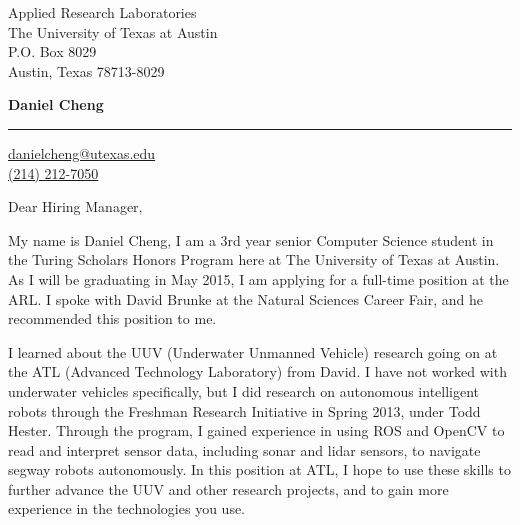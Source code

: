 \documentclass{letter} %
\begin{document}
\signature{Daniel Cheng}                   %
\longindentation=0pt                       %
\let\raggedleft\raggedright                %
 
 
\begin{letter}{Applied Research Laboratories \\
The University of Texas at Austin \\
P.O. Box 8029\\
Austin, Texas 78713-8029}

\begin{center}
{\fontsize{16}{19}\bf Daniel Cheng} 
\end{center}
\medskip\hrule height 1pt
\begin{center}
{\href{mailto:danielcheng@utexas.edu}{danielcheng@utexas.edu} \\ \href{tel:12142127050}{(214) 212-7050}}
\end{center}
\addvspace{1in}
 
\opening{Dear Hiring Manager,} 
 
\noindent My name is Daniel Cheng, I am a 3rd year senior Computer Science
student in the Turing Scholars Honors Program here at The University of Texas at
Austin. As I will be graduating in May 2015, I am applying for a full-time
position at the ARL. I spoke with David Brunke at the Natural Sciences Career
Fair, and he recommended this position to me.

\noindent I learned about the UUV (Underwater Unmanned Vehicle) research
going on at the ATL (Advanced Technology Laboratory) from David. I have
not worked with underwater vehicles specifically, but I did research on
autonomous intelligent robots through the Freshman Research Initiative in
Spring 2013, under Todd Hester. Through the program, I gained experience
in using ROS and OpenCV to read and interpret sensor data, including sonar
and lidar sensors, to navigate segway robots autonomously. In this
position at ATL, I hope to use these skills to further advance the
UUV and other research projects, and to gain more experience in the
technologies you use.


\end{letter}
\end{document}
